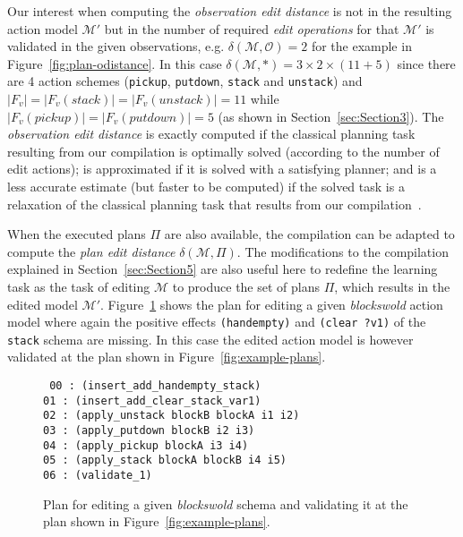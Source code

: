 \documentclass[3p,times]{elsarticle}
\begin{document}
Our interest when computing the {\em observation edit distance} is not in the resulting action model $\mathcal{M}'$ but in the number of required {\em edit operations} for that $\mathcal{M}'$ is validated in the given observations, e.g. $\delta(\mathcal{M},\mathcal{O})=2$ for the example in Figure~\ref{fig:plan-odistance}. In this case $\delta(\mathcal{M},*)=3\times 2\times (11+5)$ since there are 4 action schemes ({\small\tt pickup}, {\small\tt putdown}, {\small\tt stack} and {\small\tt unstack}) and $|F_v|=|F_v(stack)|=|F_v(unstack)|=11$ while $|F_v(pickup)|=|F_v(putdown)|=5$  (as shown in Section~\ref{sec:Section3}). The {\em observation edit distance} is exactly computed if the classical planning task resulting from our compilation is optimally solved (according to the number of edit actions); is approximated if it is solved with a satisfying planner; and is a less accurate estimate (but faster to be computed) if the solved task is a relaxation of the classical planning task that results from our compilation~\cite{bonet2001planning}.

When the executed plans $\Pi$ are also available, the compilation can be adapted to compute the {\em plan edit distance} $\delta(\mathcal{M},\Pi)$. The modifications to the compilation explained in Section~\ref{sec:Section5} are also useful here to redefine the learning task as the task of editing $\mathcal{M}$ to produce the set of plans $\Pi$, which results in the edited model $\mathcal{M}'$. Figure~\ref{fig:plan-pdistance} shows the plan for editing a given {\em blockswold} action model where again the positive effects {\tt\small (handempty)} and {\tt\small (clear ?v1)} of the {\tt\small stack} schema are missing. In this case the edited action model is however validated at the plan shown in Figure~\ref{fig:example-plans}.

\begin{figure}[hbt!]
{\tt\small
00 : (insert\_add\_handempty\_stack)\\
01 : (insert\_add\_clear\_stack\_var1)\\
02 : (apply\_unstack blockB blockA i1 i2)\\
03 : (apply\_putdown blockB i2 i3)\\
04 : (apply\_pickup blockA i3 i4)\\
05 : (apply\_stack blockA blockB i4 i5)\\
06 : (validate\_1)
}
 \caption{\small Plan for editing a given {\em blockswold} schema and validating it at the plan shown in Figure~\ref{fig:example-plans}.}
\label{fig:plan-pdistance}
\end{figure}
\end{document}
